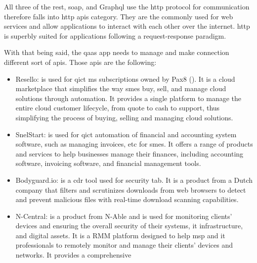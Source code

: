 \begin{multicols}{2}
      All three of the \acrshort{rest}, \acrshort{soap}, and Graph\acrshort{ql} use the \acrshort{http} protocol for
      communication therefore falls into \acrshort{http} \acrshort{api}s category. They are the commonly used for web
      services  and allow applications to interact with each other over the internet. \acrshort{http} is superbly
      suited for applications following a request-response paradigm.
\end{multicols}

\begin{multicols}{2}
      With that being said, the \acrshort{qaas} app needs to manage and make connection different sort of \acrshort{api}s.
      Those \acrshort{api}s are the following:
      \begin{itemize}
            \item Resello: is used for \acrshort{qict} \acrshort{ms} subscriptions owned by Pax8 (\textit{\cite{resello}}).
                  It is a cloud marketplace that simplifies the way \acrshort{sme}s buy, sell, and manage cloud solutions
                  through automation. It provides a single platform to manage the entire cloud customer lifecycle, from
                  quote to cash to support, thus simplifying the process of buying, selling and managing cloud
                  solutions.
            \item SnelStart: is used for \acrshort{qict} automation of financial and accounting system software,
                  such as managing invoices, \acrshort{etc} for \acrshort{sme}s. It offers a range of products and
                  services to help businesses manage their finances, including accounting software, invoicing software,
                  and financial management tools.
            \item Bodyguard.io: is a \acrshort{cdr} tool used for security tab. It is a product from a Dutch company
                  that filters and scrutinizes downloads from web browsers to detect and prevent malicious files with
                  real-time download scanning capabilities.
            \item N-Central: is a product from N-Able and is used for monitoring clients' devices and ensuring the
                  overall security of their systems, \acrshort{it} infrastructure, and digital assets. It is a
                  \gls{RMM} platform designed to help \acrshort{msp} and \acrshort{it} professionals to
                  remotely monitor and manage their clients' devices and networks. It provides a comprehensive

\end{itemize}
\end{multicols}

